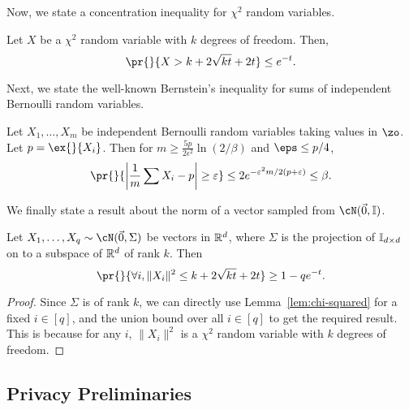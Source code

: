 Now, we state a concentration inequality for $\chi^2$ random variables.

\begin{lemma}\label{lem:chi-squared}
    Let $X$ be a $\chi^2$ random variable with $k$
    degrees of freedom. Then,
    $$\pr{}{X>k+2\sqrt{kt}+2t} \leq e^{-t}.$$
\end{lemma}

Next, we state the well-known Bernstein's inequality
for sums of independent Bernoulli random variables.

\begin{lemma}\label{lem:chernoff-add}
    Let $X_1,\dots,X_m$ be independent Bernoulli random variables
    taking values in $\zo$. Let $p = \ex{}{X_i}$.
    Then for $m \geq \frac{5p}{2\epsilon^2}\ln(2/\beta)$ and
    $\eps \leq p/4$,
    $$\pr{}{\abs{\frac{1}{m}\sum{X_i}-p} \geq \epsilon}
        \leq 2e^{-\epsilon^2m/2(p+\epsilon)}
        \leq \beta.$$
\end{lemma}

We finally state a result about the norm of a
vector sampled from $\cN(\vec{0},\id)$.

\begin{lemma}\label{lem:gauss-vector-norm}
    Let $X_1,\dots,X_q \sim \cN(\vec{0},\Sigma)$ be vectors in
    $\mathbb{R}^d$, where $\Sigma$ is the projection of $\mathbb{I}_{d \times d}$
    on to a subspace of $\mathbb{R}^d$ of rank $k$. Then
    $$\pr{}{\forall i, \|X_i\|^2 \leq k + 2\sqrt{kt} + 2t} \geq 1-qe^{-t}.$$
\end{lemma}
\begin{proof}
    Since $\Sigma$ is of rank $k$, we can directly
    use Lemma~\ref{lem:chi-squared} for a fixed $i \in [q]$,
    and the union bound over all $i \in [q]$ to get
    the required result. This is because for any $i$,
    $\|X_i\|^2$ is a $\chi^2$ random variable with $k$
    degrees of freedom.
\end{proof}


\subsection{Privacy Preliminaries}

